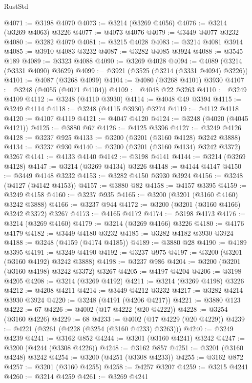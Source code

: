 \begin{lexlean}{RustStd}
\begin{coremodule}
@4071 := @3198 @4070
@4073 := @3214 (@3269 @4056)
@4076 := @3214 (@3269 @4063) @3226
@4077 := @4073 @4076
@4079 := @3449 @4077 @3232
@4080 := @3282 @4079
@4081 := @3215 @4028
@4083 := @3214 @4081 @3914
@4085 := @3910 @4083 @3232
@4087 := @3282 @4085 @3924
@4088 := @3545 @189
@4089 := @3323 @4088
@4090 := @3269 @4028
@4094 := @4089 (@3214 (@3331 @4090) @3629)
@4099 := @3921 (@3525 (@3214 (@3331 @4094) @3226))
@4101 := @4087 (@3268 @4099)
@4104 := @4080 (@3268 @4101) @3930
@4107 := @3248 (@4055 (@4071 @4104))
@4109 := @4048 @22 @3263
@4110 := @3249 @4109
@4112 := @3248 (@4110 @3930)
@4114 := @4048 @49 @3394
@4115 := @3249 @4114
@4118 := @3248 (@4115 @3930) @3274
@4119 := @4112 @4118
@4120 := @4107 @4119
@4121 := @4047 @4120
@4124 := @3248 (@4020 (@4045 @4121))
@4125 := @3880 @67
@4126 := @4125 @3396
@4127 := @3249 @4126
@4128 := @3237 @925
@4133 := @3200 (@3201 (@3160 @4128) @3242 @3888)
@4134 := @3237 @930
@4140 := @3200 (@3201 (@3160 @4134) @3242 @3372) @3267
@4141 := @4133 @4140
@4142 := @3198 @4141
@4144 := @3214 (@3269 @4128)
@4147 := @3214 (@3269 @4134) @3226
@4148 := @4144 @4147
@4150 := @3449 @4148 @3232
@4153 := @3282 @4150 @3930 @3924
@4156 := @3248 (@4127 (@4142 @4153))
@4157 := @3880 @82
@4158 := @4157 @3395
@4159 := @3249 @4158
@4160 := @3237 @935
@4165 := @3200 (@3201 (@3160 @4160) @3242 @3888)
@4166 := @3237 @944
@4172 := @3200 (@3201 (@3160 @4166) @3242 @3372) @3267
@4173 := @4165 @4172
@4174 := @3198 @4173
@4176 := @3214 (@3269 @4160)
@4179 := @3214 (@3269 @4166) @3226
@4180 := @4176 @4179
@4182 := @3449 @4180 @3232
@4185 := @3282 @4182 @3930 @3924
@4188 := @3248 (@4159 (@4174 @4185))
@4189 := @3880 @28
@4190 := @4189 @3395
@4191 := @3249 @4190
@4192 := @3237 @975
@4197 := @3200 (@3201 (@3160 @4192) @3242 @3888)
@4198 := @3237 @986
@4204 := @3200 (@3201 (@3160 @4198) @3242 @3372) @3267
@4205 := @4197 @4204
@4206 := @3198 @4205
@4208 := @3214 (@3269 @4192)
@4211 := @3214 (@3269 @4198) @3226
@4212 := @4208 @4211
@4214 := @3449 @4212 @3232
@4217 := @3282 @4214 @3930 @3924
@4220 := @3248 (@4191 (@4206 @4217))
@4221 := @3880 @123
@4222 := 67
@4226 := @4002 (@17 @4222 (@20 @4222))
@4228 := @3254 (@3160 @4226)
@4229 := 68
@4233 := @4002 (@17 @4229 (@20 @4229))
@4239 := @4221 (@3261 (@4228 (@3254 (@3160 @4233) @3263)))
@4240 := @3249 @4239
@4241 := @3162 @852
@4244 := @3201 (@3160 @4241) @3242
@4247 := @3200 (@4244 (@3308 @4226))
@4248 := @3162 @857
@4251 := @3201 (@3160 @4248) @3242
@4254 := @3200 (@4251 (@3308 @4233))
@4255 := @3162 @872
@4257 := @3201 (@3160 @4255)
@4258 := @4257 @3207
@4259 := @3215 @4241
@4260 := @3214 @4259
@4261 := @3269 @4241

\end{coremodule}
\end{lexlean}
